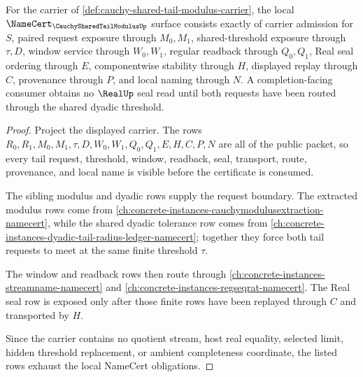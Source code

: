 \begin{theorem}
\label{thm:cauchy-shared-tail-modulus-namecert-obligations}
For the carrier of \autoref{def:cauchy-shared-tail-modulus-carrier}, the local $\NameCert_{\CauchySharedTailModulusUp}$ surface consists exactly of carrier admission for $S$, paired request exposure through $M_0,M_1$, shared-threshold exposure through $\tau,D$, window service through $W_0,W_1$, regular readback through $Q_0,Q_1$, Real seal ordering through $E$, componentwise stability through $H$, displayed replay through $C$, provenance through $P$, and local naming through $N$. A completion-facing consumer obtains no $\RealUp$ seal read until both requests have been routed through the shared dyadic threshold.
\end{theorem}
\begin{proof}
Project the displayed carrier. The rows $R_0,R_1,M_0,M_1,\tau,D,W_0,W_1,Q_0,Q_1,E,H,C,P,N$ are all of the public packet, so every tail request, threshold, window, readback, seal, transport, route, provenance, and local name is visible before the certificate is consumed.

The sibling modulus and dyadic rows supply the request boundary. The extracted modulus rows come from \autoref{ch:concrete-instances-cauchymodulusextraction-namecert}, while the shared dyadic tolerance row comes from \autoref{ch:concrete-instances-dyadic-tail-radius-ledger-namecert}; together they force both tail requests to meet at the same finite threshold $\tau$.

The window and readback rows then route through \autoref{ch:concrete-instances-streamname-namecert} and \autoref{ch:concrete-instances-regseqrat-namecert}. The Real seal row is exposed only after those finite rows have been replayed through $C$ and transported by $H$.

Since the carrier contains no quotient stream, host real equality, selected limit, hidden threshold replacement, or ambient completeness coordinate, the listed rows exhaust the local NameCert obligations.
\end{proof}

